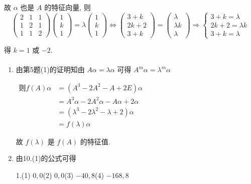 		 故 \( \alpha \) 也是 \( A \) 的特征向量, 则
		 \[ \begin{pmatrix}
				 2 & 1 & 1 \\
				 1 & 2 & 1 \\
				 1 & 1 & 2
			 \end{pmatrix}\begin{pmatrix}
				 1 \\
				 k \\
				 1
			 \end{pmatrix} = \lambda\begin{pmatrix}
				 1 \\
				 k \\
				 1
			 \end{pmatrix} \Leftrightarrow \begin{pmatrix}
				 3 + k  \\
				 2k + 2 \\
				 3 + k
			 \end{pmatrix} = \begin{pmatrix}
				 \lambda   \\
				 \lambda k \\
				 \lambda
			 \end{pmatrix} \Rightarrow \begin{cases}
				 3 + k = \lambda    \\
				 2k + 2 = \lambda k \\
				 3 + k = \lambda
			 \end{cases} \]

		 得 \( k = 1 \) 或 \( -2 \).


	 \paragraph{} %
		 \begin{enumerate}
			 \item %
			       由第5题(1)的证明知由 \( A\alpha = \lambda\alpha \) 可得 \( A^{m}\alpha = \lambda^{m}\alpha \)

			       \(\begin{aligned}
				       \text{则} f(A)\alpha & = (A^{3} - 2A^{2} - A + 2E)\alpha                  \\
				                           & = A^{3}\alpha - 2A^{2}\alpha - A\alpha + 2\alpha   \\
				                           & = (\lambda^{3} - 2\lambda^{2} - \lambda + 2)\alpha \\
				                           & = f(\lambda)\alpha \quad
			       \end{aligned}\)

			       故 \(f(\lambda)\) 是 \(f(A)\) 的特征值.
			 \item %
			       由10.(1)的公式可得

			       1.(1) \( 0, 0 \)\quad(2) \( 0, 0 \)\quad (3) \( -40, 8 \)\quad (4) \( -168, 8 \)

		 \end{enumerate}


